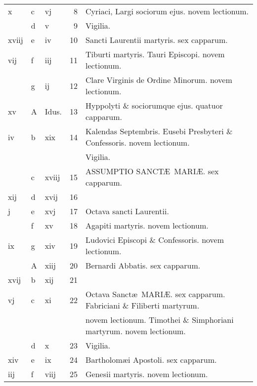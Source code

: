 \documentclass[letter,11pt]{book}
\begin{document}
\begin{center}
\begin{tabular}{l | l | l | r | l}
\color{Red} x & c & \color{Red} vj & 8 & Cyriaci, Largi sociorum ejus. \color{Red} novem lectionum. \\
\color{Red}  & d & \color{Red} v & 9 & \qquad Vigilia. \\
\color{Red} xviij & e & \color{Red} iv & 10 & \color{Red} Sancti Laurentii martyris. \color{black} sex capparum. \\
\color{Red} vij & f & \color{Red} iij & 11 & Tiburti martyris. \quad Tauri Episcopi. \color{Red} novem lectionum. \\
\color{Red}  & g & \color{Red} ij & 12 & Clare Virginis de Ordine Minorum. \color{Red} novem lectionum. \\
\color{Red} xv & \color{Red} A & Idus. & 13 & Hyppolyti \& sociorumque ejus. \color{Red} quatuor capparum. \\
\color{Red} iv & b & \color{Red} xix & 14 & \color{Red} Kalendas Septembris. \color{black} Eusebi Presbyteri \& Confessoris. \color{Red} novem lectionum. \\
 &  &  &  & \quad Vigilia. \\
\color{Red}  & c & \color{Red} xviij & 15 & \color{Red} ASSUMPTIO SANCT\AE \ MARI\AE . \color{black} sex capparum. \\
\color{Red} xij & d & \color{Red} xvij & 16 & \\
\color{Red} j & e & \color{Red} xvj & 17 & Octava sancti Laurentii. \\
\color{Red}  & f & \color{Red} xv & 18 & Agapiti martyris. \color{Red} novem lectionum. \\
\color{Red} ix & g & \color{Red} xiv & 19 & Ludovici Episcopi \& Confessoris. \color{Red} novem lectionum. \\
\color{Red}  & \color{Red} A & \color{Red} xiij & 20 & Bernardi Abbatis. \color{Red} sex capparum. \\
\color{Red} xvij & b & \color{Red} xij & 21 & \\
\color{Red} vj & c & \color{Red} xi & 22 & Octava Sanct\ae \ MARI\AE . \color{Red} sex capparum. \color{black} Fabriciani \& Filiberti martyrum. \\
 &  &  &  & \quad \color{Red} novem lectionum. \color{black} Timothei \& Simphoriani martyrum. \color{Red} novem lectionum. \\
\color{Red}  & d & \color{Red} x & 23 & \qquad Vigilia. \\
\color{Red} xiv & e & \color{Red} ix & 24 & \color{Red} Bartholom\ae i Apostoli. \color{black} sex capparum. \\
\color{Red} iij & f & \color{Red} viij & 25 & Genesii martyris. \color{Red} novem lectionum. \\

\end{tabular}
\end{center}
\end{document}
